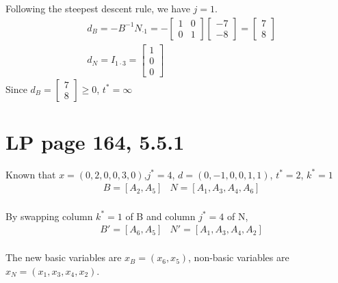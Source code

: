 \documentclass[11pt]{article}
\begin{document}
Following the steepest descent rule, we have $j = 1$.
\begin{align*}
& d_B = -B^{-1}N_{\cdot 1} = -\begin{bmatrix} 1 & 0 \\ 0 & 1\end{bmatrix}\begin{bmatrix} -7 \\ -8 \end{bmatrix} = \begin{bmatrix} 7 \\ 8 \end{bmatrix} \\
& d_N = I_{1\cdot 3} = \begin{bmatrix} 1 \\ 0 \\ 0 \end{bmatrix}
\end{align*}
Since $d_B = \begin{bmatrix} 7 \\ 8 \end{bmatrix}  \geq 0 $, $t^*=\infty$

\section{LP page 164, 5.5.1}
Known that $x=(0, 2, 0, 0, 3, 0)$,$j^*=4$, $d=(0, -1, 0, 0, 1, 1)$, $t^*=2$, $k^*=1$
\begin{align*}
    & B = [A_2, A_5] & N = [A_1, A_3, A_4, A_6] \\
\end{align*}

By swapping column $k^*=1$ of B and column $j^*=4$ of N,
\begin{align*}
    & B' = [A_6, A_5] & N' = [A_1, A_3, A_4, A_2]\\
\end{align*}

The new basic variables are $x_B = (x_6, x_5)$, non-basic variables are $x_N = (x_1, x_3, x_4, x_2)$.
\end{document}
